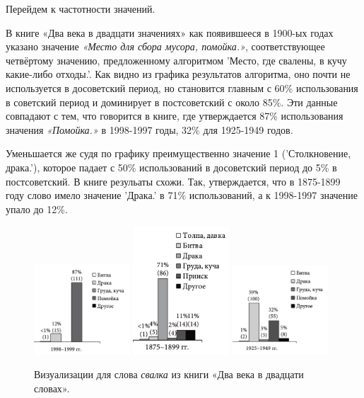 Перейдем к частотности значений.

В книге «Два века в двадцати значениях» как появившееся в 1900-ых годах указано
значение \textit{«Место для сбора мусора, помойка.»}, соответствующее четвёртому значению,
предложенному алгоритмом ’Место, где свалены, в кучу какие-либо отходы.’.
Как видно из графика результатов алгоритма, оно почти не используется в досоветский период,
но становится главным
с 60\% использования в советский период и доминирует в постсоветский с около 85\%.
Эти данные совпадают с тем, что говорится в книге, где утверждается 87\% использования
значения \textit{«Помойка.»} в 1998-1997 годы, 32\% для 1925-1949 годов.

Уменьшается же судя по графику преимущественно значение 1 (’Столкновение, драка.’),
которое падает с 50\% использований в досоветский период до 5\% в постсоветский.
В книге резульаты схожи.
Так, утверждается, что в 1875-1899 году слово имело значение ’Драка.’
в 71\% использований,
а к 1998-1997 значение упало до 12\%.

\noindent %
\begin{figure}[H]
    \centering %
    \includegraphics[width=0.32\textwidth]{img/book/Свалка 1998-1999}
    \hfill %
    \includegraphics[width=0.32\textwidth]{img/book/Свалка 1875-1799}
    \hfill %
    \includegraphics[width=0.32\textwidth]{img/book/Свалка 1925-1949}
    \caption{Визуализации для слова \textit{свалка} из книги «Два века в двадцати словах».}
\end{figure}


